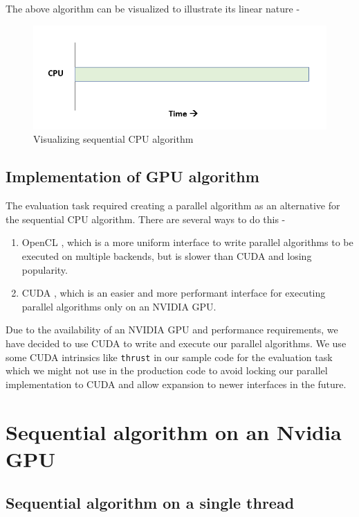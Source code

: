 \documentclass{article}
\begin{document}
\pagebreak
The above algorithm can be visualized to illustrate its linear nature -
\begin{figure}[H]
\includegraphics[width=\textwidth]{Graphics/cpu.PNG}
\caption{Visualizing sequential CPU algorithm}
\end{figure}

\subsection{Implementation of GPU algorithm}

The evaluation task required creating a parallel algorithm as an alternative for the sequential CPU algorithm. There are several ways to do this -
\begin{enumerate}
    \item OpenCL \cite{opencl}, which is a more uniform interface to write parallel algorithms to be executed on multiple backends, but is slower than CUDA and losing popularity.
    \item CUDA \cite{cuda}, which is an easier and more performant interface for executing parallel algorithms only on an NVIDIA GPU.
\end{enumerate}
Due to the availability of an NVIDIA GPU and performance requirements, we have decided to use CUDA to write and execute our parallel algorithms.
\smallbreak
\noindent We use some CUDA intrinsics like \texttt{thrust} \cite{thrust} in our sample code for the evaluation task which we might not use in the production code to avoid locking our parallel implementation to CUDA and allow expansion to newer interfaces in the future.

\section{Sequential algorithm on an Nvidia GPU}

\subsection{Sequential algorithm on a single thread}
\end{document}

